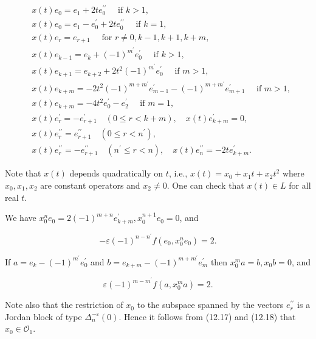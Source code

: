 \documentclass[10pt]{article}
\begin{document}
$$
\begin{aligned}
& x(t) e_{0}=e_{1}+2 t e_{0}^{\prime \prime} \quad \text { if } k>1, \\
& x(t) e_{0}=e_{1}-e_{0}^{\prime}+2 t e_{0}^{\prime \prime} \quad \text { if } k=1, \\
& x(t) e_{r}=e_{r+1} \quad \text { for } r \neq 0, k-1, k+1, k+m, \\
& x(t) e_{k-1}=e_{k}+(-1)^{m^{\prime}} e_{0}^{\prime} \quad \text { if } k>1, \\
& x(t) e_{k+1}=e_{k+2}+2 t^{2}(-1)^{m^{\prime}} e_{0}^{\prime} \quad \text { if } m>1, \\
& x(t) e_{k+m}=-2 t^{2}(-1)^{m+m^{\prime}} e_{m-1}^{\prime}-(-1)^{m+m^{\prime}} e_{m+1}^{\prime} \quad \text { if } m>1, \\
& x(t) e_{k+m}=-4 t^{2} e_{0}^{\prime}-e_{2}^{\prime} \quad \text { if } m=1, \\
& x(t) e_{r}^{\prime}=-e_{r+1}^{\prime} \quad(0 \leqslant r<k+m), \quad x(t) e_{k+m}^{\prime}=0, \\
& x(t) e_{r}^{\prime \prime}=e_{r+1}^{\prime \prime} \quad\left(0 \leqslant r<n^{\prime}\right), \\
& x(t) e_{r}^{\prime \prime}=-e_{r+1}^{\prime \prime} \quad\left(n^{\prime} \leqslant r<n\right), \quad x(t) e_{n}^{\prime \prime}=-2 t e_{k+m}^{\prime} .
\end{aligned}
$$

Note that $x(t)$ depends quadratically on $t$, i.e., $x(t)=x_{0}+x_{1} t+x_{2} t^{2}$ where $x_{0}, x_{1}, x_{2}$ are constant operators and $x_{2} \neq 0$. One can check that $x(t) \in L$ for all real $t$.

We have $x_{0}^{n} e_{0}=2(-1)^{m+n} e_{k+m}^{\prime}, x_{0}^{n+1} e_{0}=0$, and


\begin{equation*}
-\varepsilon(-1)^{n-n^{\prime}} f\left(e_{0}, x_{0}^{n} e_{0}\right)=2 . \tag{12.17}
\end{equation*}


If $a=e_{k}-(-1)^{m^{\prime}} e_{0}^{\prime}$ and $b=e_{k+m}-(-1)^{m+m^{\prime}} e_{m}^{\prime}$ then $x_{0}^{m} a=b, x_{0} b=0$, and


\begin{equation*}
\varepsilon(-1)^{m-m^{\prime}} f\left(a, x_{0}^{m} a\right)=2 . \tag{12.18}
\end{equation*}


Note also that the restriction of $x_{0}$ to the subspace spanned by the vectors $e_{r}^{\prime \prime}$ is a Jordan block of type $\Delta_{n}^{-\varepsilon}(0)$. Hence it follows from (12.17) and (12.18) that $x_{0} \in \mathcal{O}_{1}$.
\end{document}
